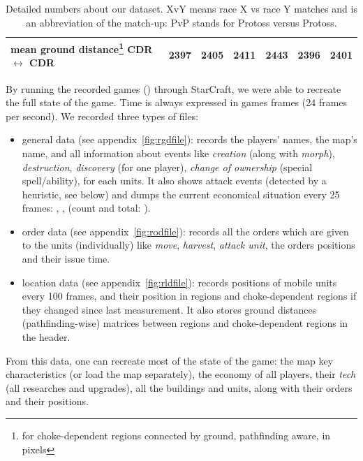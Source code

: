\begin{table}[h]
\begin{tabular}{|l|c|c|c|c|c|c|}
mean ground distance\footnote{for choke-dependent regions connected by ground, pathfinding aware, in pixels} CDR $\leftrightarrow$ CDR & 2397 & 2405 & 2411 & 2443 & 2396 & 2401 \\ %
\hline
\end{tabular}
\caption{Detailed numbers about our dataset. XvY means race X vs race Y matches and is an abbreviation of the match-up: PvP stands for Protoss versus Protoss.}
\label{tab:dataset}
\end{table}

By running the recorded games () through StarCraft, we were able to recreate the full state of the game. Time is always expressed in games frames (24 frames per second). We recorded three types of files:
\begin{itemize}
    \item general data (see appendix~\ref{fig:rgdfile}): records the players' names, the map's name, and all information about events like \textit{creation} (along with \textit{morph}), \textit{destruction}, \textit{discovery} (for one player), \textit{change of ownership} (special spell/ability), for each units. It also shows attack events (detected by a heuristic, see below) and dumps the current economical situation every 25 frames: , ,  (count and total: ).
    \item order data (see appendix~\ref{fig:rodfile}): records all the orders which are given to the units (individually) like \textit{move}, \textit{harvest}, \textit{attack unit}, the orders positions and their issue time.
    \item location data (see appendix~\ref{fig:rldfile}): records positions of mobile units every 100 frames, and their position in regions and choke-dependent regions if they changed since last measurement. It also stores ground distances (pathfinding-wise) matrices between regions and choke-dependent regions in the header.
\end{itemize}
From this data, one can recreate most of the state of the game: the map key characteristics (or load the map separately), the economy of all players, their \textit{tech} (all researches and upgrades), all the buildings and units, along with their orders and their positions.

